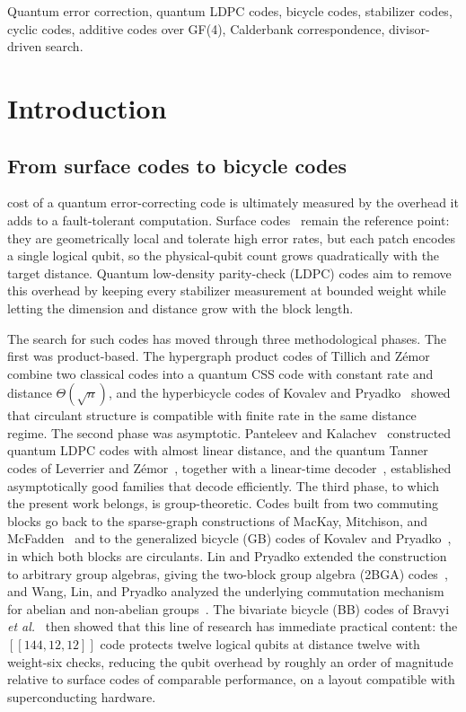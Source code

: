 \documentclass[journal,onecolumn]{IEEEtran}
\theoremstyle{definition}
\theoremstyle{remark}
\begin{document}
\begin{IEEEkeywords}
Quantum error correction, quantum LDPC codes, bicycle codes, stabilizer codes,
cyclic codes, additive codes over GF(4), Calderbank correspondence,
divisor-driven search.
\end{IEEEkeywords}

\section{Introduction}\label{sec:intro}
\subsection{From surface codes to bicycle codes}
 cost of a quantum error-correcting code is ultimately
measured by the overhead it adds to a fault-tolerant computation. Surface
codes~\cite{Kitaev03} remain the reference point: they are geometrically
local and tolerate high error rates, but each patch encodes a single logical
qubit, so the physical-qubit count grows quadratically with the target
distance. Quantum low-density parity-check (LDPC) codes aim to remove this
overhead by keeping every stabilizer measurement at bounded weight while
letting the dimension and distance grow with the block length.

The search for such codes has moved through three methodological phases. The
first was product-based. The hypergraph product codes of Tillich and
Z\'emor~\cite{TZ14} combine two classical codes into a quantum CSS code with
constant rate and distance $\Theta(\sqrt{n})$, and the hyperbicycle codes of
Kovalev and Pryadko~\cite{KP13b} showed that circulant structure is
compatible with finite rate in the same distance regime. The second phase
was asymptotic. Panteleev and Kalachev~\cite{PK22} constructed quantum LDPC
codes with almost linear distance, and the quantum Tanner codes of
Leverrier and Z\'emor~\cite{LZ22}, together with a linear-time
decoder~\cite{LZD22}, established asymptotically good families that decode
efficiently. The third phase, to which the present work belongs, is
group-theoretic. Codes built from two commuting blocks go back to the
sparse-graph constructions of MacKay, Mitchison, and McFadden~\cite{MMM04}
and to the generalized bicycle (GB) codes of Kovalev and
Pryadko~\cite{KP13a}, in which both blocks are circulants. Lin and Pryadko
extended the construction to arbitrary group algebras, giving the two-block
group algebra (2BGA) codes~\cite{2BGA}, and Wang, Lin, and Pryadko analyzed
the underlying commutation mechanism for abelian and non-abelian
groups~\cite{WLP23}. The bivariate bicycle (BB) codes of Bravyi
\emph{et al.}~\cite{BB24} then showed that this line of research has
immediate practical content: the $[[144,12,12]]$ code protects twelve
logical qubits at distance twelve with weight-six checks, reducing the
qubit overhead by roughly an order of magnitude relative to surface codes
of comparable performance, on a layout compatible with superconducting
hardware.
\end{document}
